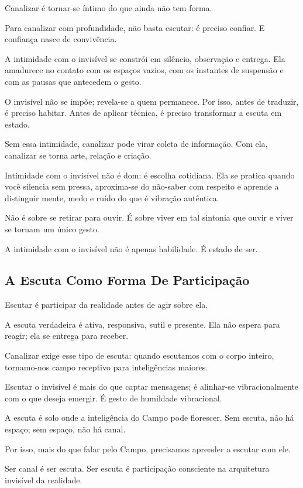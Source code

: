 \documentclass[12pt]{book}
\begin{document}
Canalizar é tornar-se íntimo do que ainda não tem forma.

Para canalizar com profundidade, não basta escutar: é preciso confiar. E confiança nasce de convivência.

A intimidade com o invisível se constrói em silêncio, observação e entrega. Ela amadurece no contato com os espaços vazios, com os instantes de suspensão e com as pausas que antecedem o gesto.

O invisível não se impõe; revela-se a quem permanece. Por isso, antes de traduzir, é preciso habitar. Antes de aplicar técnica, é preciso transformar a escuta em estado.

Sem essa intimidade, canalizar pode virar coleta de informação. Com ela, canalizar se torna arte, relação e criação.

Intimidade com o invisível não é dom: é escolha cotidiana. Ela se pratica quando você silencia sem pressa, aproxima-se do não-saber com respeito e aprende a distinguir mente, medo e ruído do que é vibração autêntica.

Não é sobre se retirar para ouvir. É sobre viver em tal sintonia que ouvir e viver se tornam um único gesto.

A intimidade com o invisível não é apenas habilidade. É estado de ser.

\subsection*{A Escuta Como Forma De Participação}

Escutar é participar da realidade antes de agir sobre ela.

A escuta verdadeira é ativa, responsiva, sutil e presente. Ela não espera para reagir; ela se entrega para receber.

Canalizar exige esse tipo de escuta: quando escutamos com o corpo inteiro, tornamo-nos campo receptivo para inteligências maiores.

Escutar o invisível é mais do que captar mensagens; é alinhar-se vibracionalmente com o que deseja emergir. É gesto de humildade vibracional.

A escuta é solo onde a inteligência do Campo pode florescer. Sem escuta, não há espaço; sem espaço, não há canal.

Por isso, mais do que falar pelo Campo, precisamos aprender a escutar com ele.

Ser canal é ser escuta. Ser escuta é participação consciente na arquitetura invisível da realidade.
\end{document}

